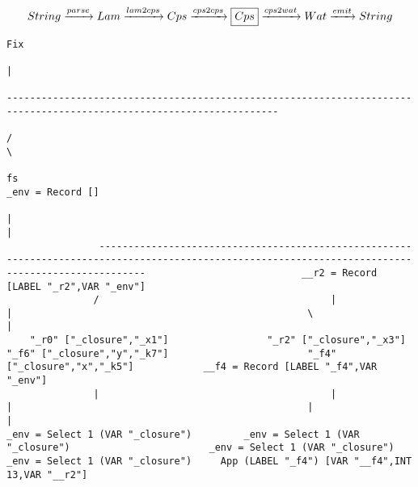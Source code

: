 \begin{landscape}
\begin{gather*}
  String \xrightarrow{parse} Lam \xrightarrow{lam2cps} Cps \xrightarrow{cps2cps} \boxed{Cps} \xrightarrow{cps2wat} Wat \xrightarrow{emit} String
\end{gather*}

\begin{lstlisting}[basicstyle=\fontsize{6.25}{7.25}\selectfont\ttfamily]
                                                                                                                   Fix
                                                                                                                    |
                                                                                            ---------------------------------------------------------------------------------------------------------------------
                                                                                           /                                                                                                                     \
                                                                                           fs                                                                                                             _env = Record []
                                                                                           |                                                                                                                     |
                ----------------------------------------------------------------------------------------------------------------------------------------------------                           __r2 = Record [LABEL "_r2",VAR "_env"]
               /                                        |                                                       |                                                   \                                            |
    "_r0" ["_closure","_x1"]                 "_r2" ["_closure","_x3"]                              "_f6" ["_closure","y","_k7"]                        "_f4" ["_closure","x","_k5"]            __f4 = Record [LABEL "_f4",VAR "_env"]
               |                                        |                                                       |                                                   |                                            |
_env = Select 1 (VAR "_closure")         _env = Select 1 (VAR "_closure")                        _env = Select 1 (VAR "_closure")                    _env = Select 1 (VAR "_closure")     App (LABEL "_f4") [VAR "__f4",INT 13,VAR "__r2"]

\end{lstlisting}
\end{landscape}
